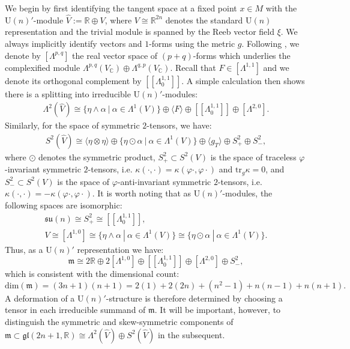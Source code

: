 \documentclass{article}
\theoremstyle{definition}
\newcommand{\R}{\mathbb{R}}
\numberwithin{equation}{section}
\begin{document}
We begin by first identifying the tangent space at a fixed point $x\in M$ with the $\mathrm{U}(n)'$-module $\widehat{V}:=\R \oplus V$, where $V\cong \mathbb{R}^{2n}$ denotes the standard $\mathrm{U}(n)$ representation and the trivial module is spanned by the Reeb vector field $\xi$. We always implicitly identify vectors and $1$-forms using the metric $g$.
Following \cite{Salbook}, we denote by $[\Lambda^{p,q}]$ the real vector space of $(p+q)$-forms which underlies the complexified module $\Lambda^{p,q}(V_{\mathbb{C}})\oplus \Lambda^{q,p}(V_{\mathbb{C}})$. Recall that $F\in [\Lambda^{1,1}]$ and we denote its orthogonal complement by $[\![\Lambda^{1,1}_0]\!]$. A simple calculation then shows there is a splitting into irreducible $\mathrm{U}(n)'$-modules:
\begin{gather*}
    \Lambda^2(\widehat{V}) \cong \{ \eta \wedge \alpha\ |\ \alpha\in \Lambda^1(V) \} \oplus \langle F\rangle \oplus [\![\Lambda^{1,1}_0]\!] \oplus [\Lambda^{2,0}].
\end{gather*}
Similarly, for the space of symmetric $2$-tensors, we have:
\begin{gather*}
    S^2(\widehat{V}) \cong 
    \langle \eta \otimes \eta \rangle \oplus  \{ \eta \odot \alpha\ |\ \alpha\in \Lambda^1(V) \} \oplus  \langle g_T\rangle \oplus S^2_+ \oplus S^2_-, 
\end{gather*}
where $\odot$ denotes the symmetric product, $S^2_+\subset S^2(V)$ is the space of traceless $\varphi$-invariant symmetric $2$-tensors, i.e. $\kappa(\cdot,\cdot)=\kappa(\varphi\cdot,\varphi\cdot)$ and $\mathrm{tr}_g\kappa=0$, and $S^2_-\subset S^2(V)$ is the space of $\varphi$-anti-invariant symmetric $2$-tensors, i.e. $\kappa(\cdot,\cdot)=-\kappa(\varphi\cdot,\varphi\cdot)$. It is worth noting that as $\mathrm{U}(n)'$-modules, the following spaces are isomorphic:
\begin{gather*}
    \mathfrak{su}(n)\cong S^2_+\cong [\![ \Lambda^{1,1}_0]\!],\\
    V\cong [\Lambda^{1,0}]\cong \{ \eta \wedge \alpha\ |\ \alpha\in \Lambda^1(V) \} \cong \{ \eta \odot \alpha\ |\ \alpha\in \Lambda^1(V) \}.
\end{gather*}
Thus, as a $\mathrm{U}(n)'$ representation we have:
\begin{equation*}
    \mathfrak{m} \cong 2 \mathbb{R}\oplus 2[\Lambda^{1,0}] \oplus [\![\Lambda^{1,1}_0]\!] 
      \oplus [\Lambda^{2,0}]\oplus  S^2_-  ,
\end{equation*}
which is consistent with the dimensional count: 
\[
\mathrm{dim}(\mathfrak{m})=(3n+1)(n+1)=2(1)+2(2n)+(n^2-1)+n(n-1)+n(n+1).\]
A deformation of a $\mathrm{U}(n)'$-structure is therefore determined by choosing a tensor in each irreducible summand of $\mathfrak{m}$. It will be important, however, to distinguish the symmetric and skew-symmetric components of $\mathfrak{m}\subset \mathfrak{gl}(2n+1,
\R)\cong \Lambda^2(\widehat{V})\oplus S^2(\widehat{V})
$ in the subsequent.
\end{document}
